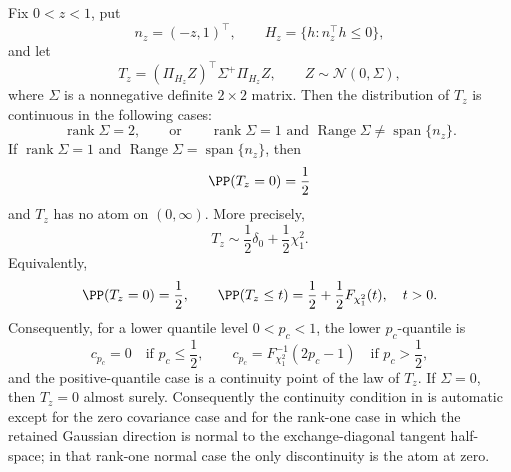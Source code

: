 \fi
\begin{lemma}\label{thm:projected-gaussian-continuity-degeneracy-main}
Fix \(0<z<1\), put
\[
n_z=(-z,1)^\top,\qquad H_z=\{h:n_z^\top h\le0\},
\]
and let
\[
T_z=(\Pi_{H_z}Z)^\top\Sigma^+\Pi_{H_z}Z,
\qquad Z\sim\mathcal N(0,\Sigma),
\]
where \(\Sigma\) is a nonnegative definite \(2\times2\) matrix.  Then the
distribution of \(T_z\) is continuous in the following cases:
\[
\operatorname{rank}\Sigma=2,
\qquad\text{or}\qquad
\operatorname{rank}\Sigma=1
\text{ and }
\operatorname{Range}\Sigma\ne \operatorname{span}\{n_z\}.
\]
If \(\operatorname{rank}\Sigma=1\) and
\(\operatorname{Range}\Sigma=\operatorname{span}\{n_z\}\), then
\[
\PP(T_z=0)=\frac12
\]
and \(T_z\) has no atom on \((0,\infty)\).  More precisely,
\[
T_z\sim \frac12\delta_0+\frac12\chi^2_1 .
\]
Equivalently,
\[
\PP(T_z=0)=\frac12,\qquad
\PP(T_z\le t)=\frac12+\frac12F_{\chi^2_1}(t),\quad t>0.
\]
Consequently, for a lower quantile level \(0<p_c<1\), the lower
\(p_c\)-quantile is
\[
c_{p_c}=0\quad\text{if }p_c\le\frac12,\qquad
c_{p_c}=F_{\chi^2_1}^{-1}(2p_c-1)\quad\text{if }p_c>\frac12,
\]
and the positive-quantile case is a continuity point of the law of \(T_z\).  If
\(\Sigma=0\), then
\(T_z=0\) almost surely.  Consequently the continuity condition in
 is automatic except
for the zero covariance case and for the rank-one case in which the retained
Gaussian direction is normal to the exchange-diagonal tangent half-space; in
that rank-one normal case the only discontinuity is the atom at zero.
\end{lemma}

